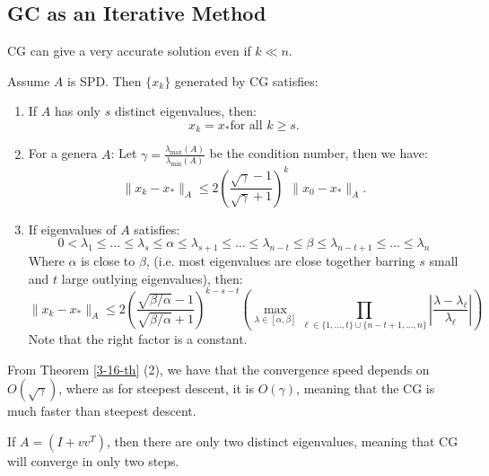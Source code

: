 \documentclass[../main/main.tex]{subfiles}
\begin{document}
\subsection{GC as an Iterative Method}
CG can give a very accurate solution even if $k \ll n$.
\begin{theorem}\label{3-16-th}
  Assume $A$ is SPD. Then $\{ x_{k}\}$ generated by CG satisfies:
  \begin{enumerate}
    \item If $A$ has only $s$ distinct eigenvalues, then: \[
          x_{k} = x_{*} \text{for all $k\geq s$.}
          \]
    \item For a genera $A$: Let $\gamma = \frac{\lambda _{\max}(A)}{\lambda _{\min }(A)} $ be the condition number, then we have: \[
\|x_{k}-x_{*}\|_{A} \leq 2 \left(\frac{\sqrt{\gamma }-1}{\sqrt{\gamma }+1} \right)^{k} \|x_{0}-x_{*}\|_{A}.
          \]
    \item If eigenvalues of $A$ satisfies: \[
          0< \lambda_{1}\leq  \ldots \leq  \lambda _{s} \leq \alpha  \leq \lambda _{s+1} \leq  \ldots  \leq  \lambda _{n-t} \leq \beta  \leq  \lambda _{n-t+1} \leq  \ldots \leq  \lambda _{n}
          \]
          Where $\alpha $ is close to $\beta $, (i.e. most eigenvalues are close together barring $s$ small and $t$ large outlying eigenvalues), then: \[
\|x_{k}-x_{*}\|_{A} \leq  2 \left(\frac{\sqrt{\beta / \alpha }-1}{\sqrt{\beta / \alpha }+1} \right)^{k-s-t} \left(\max_{\lambda  \in [\alpha, \beta]} \prod_{\ell \in \{1, \ldots , t\}\cup \{n-t+1, \ldots  , n\}} \left|\frac{\lambda -\lambda_{\ell } }{\lambda _{\ell }}  \right|\right)
          \] Note that the right factor is a constant.
  \end{enumerate}
\end{theorem}
\begin{corollary}
  From Theorem \ref{3-16-th} (2), we have that the convergence speed depends on $O(\sqrt{\gamma })$, where as for steepest descent, it is $O(\gamma)$, meaning that the CG is much faster than steepest descent.
\end{corollary}
\begin{example}
If $A = (I+vv^{T})$, then there are only two distinct eigenvalues, meaning that CG will converge in only two steps.
\end{example}
\end{document}
